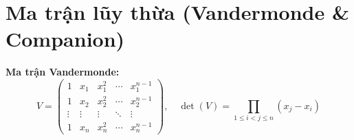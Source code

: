 \section{Ma trận lũy thừa (Vandermonde \& Companion)}

\textbf{Ma trận Vandermonde:}
\[
V = \begin{pmatrix}
1 & x_1 & x_1^2 & \cdots & x_1^{n-1} \\
1 & x_2 & x_2^2 & \cdots & x_2^{n-1} \\
\vdots & \vdots & \vdots & \ddots & \vdots \\
1 & x_n & x_n^2 & \cdots & x_n^{n-1}
\end{pmatrix}, \quad \det(V) = \prod_{1 \le i < j \le n}(x_j - x_i)
\]

